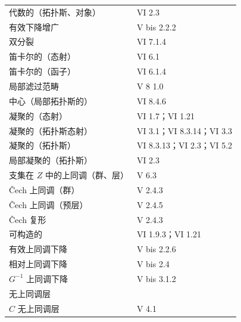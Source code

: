 \begin{longtable}{p{}p{}}
代数的（拓扑斯、对象） & VI 2.3\\
有效下降增广 & V bis 2.2.2\\
双分裂 & VI 7.1.4\\
笛卡尔的（态射） & VI 6.1\\
笛卡尔的（函子） & VI 6.1.4\\
局部滤过范畴 & V 8 1.0\\
中心（局部拓扑斯的） & VI 8.4.6\\
凝聚的（态射） & VI 1.7；VI 1.21\\
凝聚的（拓扑斯态射） & VI 3.1；VI 8.3.14；VI 3.3\\
凝聚的（拓扑斯） & VI 8.3.13；VI 2.3；VI 5.2\\
局部凝聚的（拓扑斯） & VI 2.3\\
支集在 $Z$ 中的上同调（群、层） & V 6.3\\
Čech 上同调（群） & V 2.4.3\\
Čech 上同调（预层） & V 2.4.5\\
Čech 复形 & V 2.4.3\\
可构造的 & VI 1.9.3；VI 1.21\\
有效上同调下降 & V bis 2.2.6\\
相对上同调下降 & V bis 2.4\\
$G^{-1}$ 上同调下降 & V bis 3.1.2\\
无上同调层 & \\
$C$ 无上同调层 & V 4.1\\
\end{longtable}

